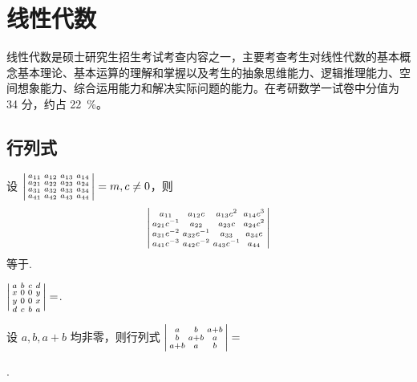 \chapter{线性代数}
	线性代数是硕士研究生招生考试考查内容之一，主要考查考生对线性代数的基本概念基本理论、基本运算的理解和掌握以及考生的抽象思维能力、逻辑推理能力、空间想象能力、综合运用能力和解决实际问题的能力。在考研数学一试卷中分值为 34 分，约占 \SI{22}{\percent}。
	\section{行列式}

	\begin{titwo}
		设 $\begin{vsmallmatrix}
			a_{11} & a_{12} & a_{13} & a_{14}\\
			a_{21} & a_{22} & a_{23} & a_{24}\\
			a_{31} & a_{32} & a_{33} & a_{34}\\
			a_{41} & a_{42} & a_{43} & a_{44}
		\end{vsmallmatrix} = m, c \ne 0$，则 
		\[
			\begin{vsmallmatrix}
				a_{11} & a_{12}c & a_{13}c^{2} & a_{14}c^{3}\\
				a_{21}c^{-1} & a_{22} & a_{23}c & a_{24}c^{2}\\
				a_{31}c^{-2} & a_{32}c^{-1} & a_{33} & a_{34}c\\
				a_{41}c^{-3} & a_{42}c^{-2} & a_{43}c^{-1} & a_{44}
			\end{vsmallmatrix}
		\]
		等于\kuo.

	\end{titwo}

	\begin{titwo}
		$\begin{vsmallmatrix}
			a & b & c & d \\
			x & 0 & 0 & y \\
			y & 0 & 0 & x \\
			d & c & b & a
		\end{vsmallmatrix} = $\htwo.
	\end{titwo}

	\begin{titwo}
		设 $a, b, a + b$ 均非零，则行列式 $\begin{vsmallmatrix}
			a & b & a + b \\
			b & a + b & a \\
			a + b & a & b \\
		\end{vsmallmatrix} = $
		
		\noindent\htwo.
	\end{titwo}


